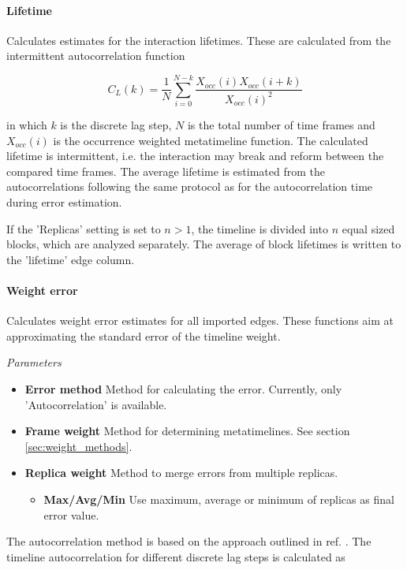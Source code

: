 \paragraph{Lifetime}

Calculates estimates for the interaction lifetimes. These are calculated from the intermittent autocorrelation function

\begin{equation}
  \label{eq:lifetime_autocorrelation}
     C_L(k) = \frac{1}{N} \sum_{i=0}^{N-k} \frac{X_{occ}(i) X_{occ}(i+k)}{X_{occ}(i)^2}
\end{equation}

in which $k$ is the discrete lag step, $N$ is the total number of time frames and $X_{occ}(i)$ is the occurrence weighted metatimeline function. The calculated lifetime is intermittent, i.e. the interaction may break and reform between the compared time frames. The average lifetime is estimated from the autocorrelations following the same protocol as for the autocorrelation time during error estimation.

If the 'Replicas' setting is set to $n > 1$, the timeline is divided into $n$ equal sized blocks, which are analyzed separately. The average of block lifetimes is written to the 'lifetime' edge column.

\paragraph{Weight error}
\label{sec:weight_error}
Calculates weight error estimates for all imported edges. These functions aim at approximating the standard error of the timeline weight.

\textit{Parameters}
\begin{itemize}
\item \textbf{Error method} Method for calculating the error. Currently, only 'Autocorrelation' is available.
\item \textbf{Frame weight} Method for determining metatimelines. See section \ref{sec:weight_methods}.
\item \textbf{Replica weight} Method to merge errors from multiple replicas.
  \begin{itemize}
    \item \textbf{Max/Avg/Min} Use maximum, average or minimum of replicas as final error value.
   \end{itemize}
\end{itemize}

The autocorrelation method is based on the approach outlined in ref. \cite{Grossfield2009}. The timeline autocorrelation for different discrete lag steps is calculated as

